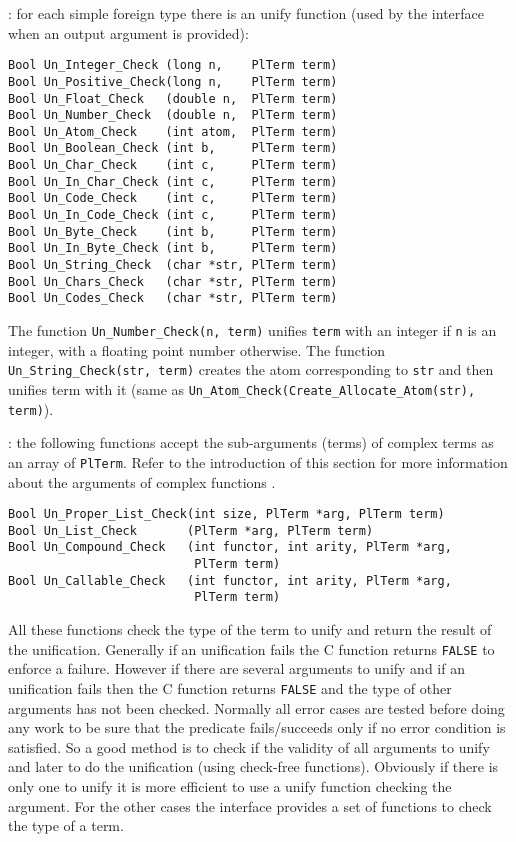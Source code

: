 : for each simple foreign type
 there is an unify function (used by the
interface when an output argument is provided):

\begin{Indentation}
\begin{verbatim}
Bool Un_Integer_Check (long n,    PlTerm term)
Bool Un_Positive_Check(long n,    PlTerm term)
Bool Un_Float_Check   (double n,  PlTerm term)
Bool Un_Number_Check  (double n,  PlTerm term)
Bool Un_Atom_Check    (int atom,  PlTerm term)
Bool Un_Boolean_Check (int b,     PlTerm term)
Bool Un_Char_Check    (int c,     PlTerm term)
Bool Un_In_Char_Check (int c,     PlTerm term)
Bool Un_Code_Check    (int c,     PlTerm term)
Bool Un_In_Code_Check (int c,     PlTerm term)
Bool Un_Byte_Check    (int b,     PlTerm term)
Bool Un_In_Byte_Check (int b,     PlTerm term)
Bool Un_String_Check  (char *str, PlTerm term)
Bool Un_Chars_Check   (char *str, PlTerm term)
Bool Un_Codes_Check   (char *str, PlTerm term)
\end{verbatim}
\end{Indentation}

The function \texttt{Un\_Number\_Check(n, term)} unifies \texttt{term} with
an integer if \texttt{n} is an integer, with a floating point number
otherwise. The function \texttt{Un\_String\_Check(str, term)} creates the
atom corresponding to \texttt{str} and then unifies term with it (same as
\texttt{Un\_Atom\_Check(Create\_Allocate\_Atom(str), term)}).

: the following functions accept the sub-arguments
(terms) of complex terms as an array of \texttt{PlTerm}. Refer to the
introduction of this section for more information about the arguments of
complex functions .

\begin{Indentation}
\begin{verbatim}
Bool Un_Proper_List_Check(int size, PlTerm *arg, PlTerm term)
Bool Un_List_Check       (PlTerm *arg, PlTerm term)
Bool Un_Compound_Check   (int functor, int arity, PlTerm *arg,
                          PlTerm term)
Bool Un_Callable_Check   (int functor, int arity, PlTerm *arg,
                          PlTerm term)
\end{verbatim}
\end{Indentation}

All these functions check the type of the term to unify and return the
result of the unification. Generally if an unification fails the C function
returns \texttt{FALSE} to enforce a failure. However if there are several
arguments to unify and if an unification fails then the C function returns
\texttt{FALSE} and the type of other arguments has not been checked.
Normally all error cases are tested before doing any work to be sure that
the predicate fails/succeeds only if no error condition is satisfied. So a
good method is to check if the validity of all arguments to unify and later
to do the unification (using check-free functions). Obviously if there is
only one to unify it is more efficient to use a unify function checking the
argument. For the other cases the interface provides a set of functions to
check the type of a term.

